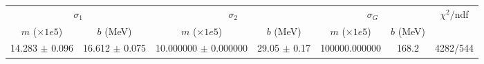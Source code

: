 \begin{tabular}{cc|cc|cc||c}
\multicolumn{2}{c|}{$\sigma_1$} & \multicolumn{2}{|c}{$\sigma_2$} & \multicolumn{2}{|c}{$\sigma_G$}  & \multirow{2}{*}{$\chi^2/$ndf}\\
$m$ ($\times1e5$) & $b$ (MeV) & $m$ ($\times1e5$) & $b$ (MeV) & $m$ ($\times1e5$) & $b$ (MeV) & \\
\hline
14.283 $\pm$ 0.096 & 16.612 $\pm$ 0.075 & 10.000000 $\pm$ 0.000000 & 29.05 $\pm$ 0.17 & 100000.000000 & 168.2 & 4282/544\\
\end{tabular}
